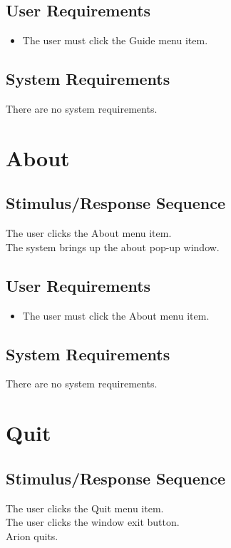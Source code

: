 \documentclass{scrreprt}
\begin{document}
    \subsection*{User Requirements}
        \begin{itemize}
            \item The user must click the Guide menu item.
        \end{itemize}

    \subsection*{System Requirements}
        There are no system requirements.

\section{About}
    \subsection*{Stimulus/Response Sequence}
        \begin{flushleft}
             The user clicks the About menu item. \\
             The system brings up the about pop-up window. \\
        \end{flushleft}

    \subsection*{User Requirements}
        \begin{itemize}
            \item The user must click the About menu item.
        \end{itemize}

    \subsection*{System Requirements}
        There are no system requirements.

\section{Quit}
    \subsection*{Stimulus/Response Sequence}
        \begin{flushleft}
             The user clicks the Quit menu item. \\
             The user clicks the window exit button. \\
             Arion quits. \\
        \end{flushleft}
\end{document}
